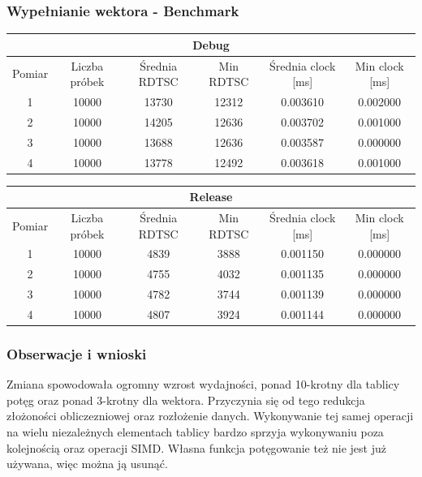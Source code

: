 \documentclass{article}
\begin{document}
	\subsubsection{Wypełnianie wektora - Benchmark}
	\begin{center}
		\begin{tabular}{|c|c|c|c|c|c|} \hline
			\multicolumn{6}{|c|}{Debug} \\\hline
			Pomiar  & Liczba próbek & Średnia RDTSC & Min RDTSC & Średnia clock [ms] & Min clock [ms] \\\hline
			\hline
			1 & 10000 & 13730 & 12312 & 0.003610 & 0.002000 \\\hline
			2 & 10000 & 14205 & 12636 & 0.003702 & 0.001000 \\\hline
			3 & 10000 & 13688 & 12636 & 0.003587 & 0.000000 \\\hline
			4 & 10000 & 13778 & 12492 & 0.003618 & 0.001000 \\\hline
			
		\end{tabular}
	\end{center}
	\begin{center}
		\begin{tabular}{|c|c|c|c|c|c|} \hline
			\multicolumn{6}{|c|}{Release} \\\hline
			Pomiar  & Liczba próbek & Średnia RDTSC & Min RDTSC & Średnia clock [ms] & Min clock [ms] \\\hline
			\hline
			1 & 10000 & 4839 & 3888 & 0.001150 & 0.000000 \\\hline
			2 & 10000 & 4755 & 4032 & 0.001135 & 0.000000 \\\hline
			3 & 10000 & 4782 & 3744 & 0.001139 & 0.000000 \\\hline
			4 & 10000 & 4807 & 3924 & 0.001144 & 0.000000 \\\hline
			
		\end{tabular}
	\end{center}
	
	\subsubsection{Obserwacje i wnioski}
	Zmiana spowodowała ogromny wzrost wydajności, ponad 10-krotny dla tablicy potęg oraz ponad 3-krotny dla wektora.
	Przyczynia się od tego redukcja złożoności obliczezniowej oraz rozłożenie danych. Wykonywanie tej samej operacji na wielu niezależnych elementach tablicy bardzo sprzyja wykonywaniu poza kolejnością oraz operacji SIMD.
	Własna funkcja potęgowanie też nie jest już używana, więc można ją usunąć. 
	
\end{document}
